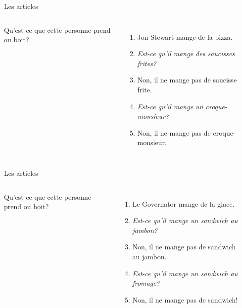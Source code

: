 \documentclass{beamer}
\begin{document}
  \begin{frame}{Les articles}
    \begin{columns}
        Qu'est-ce que cette personne prend ou boit?
        \begin{enumerate}
          \item<2-> Jon Stewart mange de la pizza.
          \item<2-> \emph{Est-ce qu'il mange des saucisses frites?}
          \item<3-> Non, il ne mange pas de saucisse frite.
          \item<3-> \emph{Est-ce qu'il mange un croque-monsieur?}
          \item<4-> Non, il ne mange pas de croque-monsieur.
        \end{enumerate}
        \begin{minipage}[c][0.6\textwidth]{\linewidth}
          \begin{center}
          \end{center}
        \end{minipage}
    \end{columns}
  \end{frame}

  \begin{frame}{Les articles}
    \begin{columns}
        Qu'est-ce que cette personne prend ou boit?
        \begin{enumerate}
          \item<2-> Le Governator mange de la glace.
          \item<2-> \emph{Est-ce qu'il mange un sandwich au jambon?}
          \item<3-> Non, il ne mange pas de sandwich au jambon.
          \item<3-> \emph{Est-ce qu'il mange un sandwich au fromage?}
          \item<4-> Non, il ne mange pas de sandwich!
        \end{enumerate}
        \begin{minipage}[c][0.6\textwidth]{\linewidth}
          \begin{center}
          \end{center}
        \end{minipage}
    \end{columns}
  \end{frame}
\end{document}
